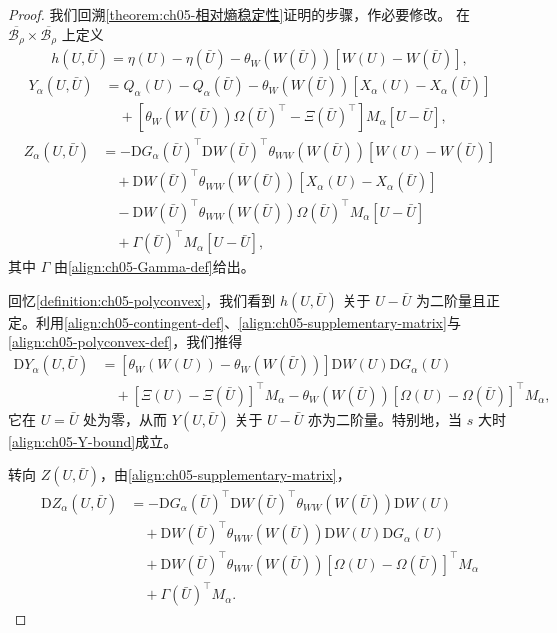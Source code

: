 \documentclass[../../main.tex]{subfiles}
\begin{document}
\begin{proof}
我们回溯\cref{theorem:ch05-相对熵稳定性}证明的步骤，作必要修改。
在 $\overline{\mathscr{B}_{\rho}}\times\overline{\mathscr{B}_{\rho}}$ 上定义
\begin{align}
h(U,\bar{U})=\eta(U)-\eta(\bar{U})-\theta_{W}(W(\bar{U}))[W(U)-W(\bar{U})],\label{align:ch05-h-polyconvex}
\end{align}
\begin{align}
Y_{\alpha}(U,\bar{U})&=Q_{\alpha}(U)-Q_{\alpha}(\bar{U})-\theta_{W}(W(\bar{U}))[X_{\alpha}(U)-X_{\alpha}(\bar{U})]\nonumber\\
&\quad+[\theta_{W}(W(\bar{U}))\Omega(\bar{U})^{\top}-\Xi(\bar{U})^{\top}]M_{\alpha}[U-\bar{U}],\label{align:ch05-Yalpha-polyconvex}
\end{align}
\begin{align}
Z_{\alpha}(U,\bar{U})&=-\mathrm{D}G_{\alpha}(\bar{U})^{\top}\mathrm{D}W(\bar{U})^{\top}\theta_{WW}(W(\bar{U}))[W(U)-W(\bar{U})]\nonumber\\
&\quad+\mathrm{D}W(\bar{U})^{\top}\theta_{WW}(W(\bar{U}))[X_{\alpha}(U)-X_{\alpha}(\bar{U})]\nonumber\\
&\quad-\mathrm{D}W(\bar{U})^{\top}\theta_{WW}(W(\bar{U}))\Omega(\bar{U})^{\top}M_{\alpha}[U-\bar{U}]\nonumber\\
&\quad+\Gamma(\bar{U})^{\top}M_{\alpha}[U-\bar{U}],\label{align:ch05-Zalpha-polyconvex}
\end{align}
其中 $\Gamma$ 由\eqref{align:ch05-Gamma-def}给出。

回忆\cref{definition:ch05-polyconvex}，我们看到 $h(U,\bar{U})$ 关于 $U-\bar{U}$ 为二阶量且正定。利用\eqref{align:ch05-contingent-def}、\eqref{align:ch05-supplementary-matrix}与\eqref{align:ch05-polyconvex-def}，我们推得
\begin{align}
\mathrm{D}Y_{\alpha}(U,\bar{U})&=[\theta_{W}(W(U))-\theta_{W}(W(\bar{U}))]\mathrm{D}W(U)\mathrm{D}G_{\alpha}(U)\nonumber\\
&\quad+[\Xi(U)-\Xi(\bar{U})]^{\top}M_{\alpha}-\theta_{W}(W(\bar{U}))[\Omega(U)-\Omega(\bar{U})]^{\top}M_{\alpha},\label{align:ch05-DY}
\end{align}
它在 $U=\bar{U}$ 处为零，从而 $Y(U,\bar{U})$ 关于 $U-\bar{U}$ 亦为二阶量。特别地，当 $s$ 大时\eqref{align:ch05-Y-bound}成立。

转向 $Z(U,\bar{U})$，由\eqref{align:ch05-supplementary-matrix}，
\begin{align}
\mathrm{D}Z_{\alpha}(U,\bar{U})&=-\mathrm{D}G_{\alpha}(\bar{U})^{\top}\mathrm{D}W(\bar{U})^{\top}\theta_{WW}(W(\bar{U}))\mathrm{D}W(U)\nonumber\\
&\quad+\mathrm{D}W(\bar{U})^{\top}\theta_{WW}(W(\bar{U}))\mathrm{D}W(U)\mathrm{D}G_{\alpha}(U)\nonumber\\
&\quad+\mathrm{D}W(\bar{U})^{\top}\theta_{WW}(W(\bar{U}))[\Omega(U)-\Omega(\bar{U})]^{\top}M_{\alpha}\nonumber\\
&\quad+\Gamma(\bar{U})^{\top}M_{\alpha}.\label{align:ch05-DZ}
\end{align}


\end{proof}
\end{document}
